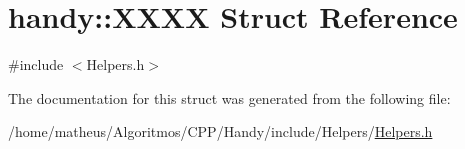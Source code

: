 \hypertarget{structhandy_1_1XXXX}{}\section{handy\+:\+:X\+X\+XX Struct Reference}
\label{structhandy_1_1XXXX}


{\ttfamily \#include $<$Helpers.\+h$>$}



The documentation for this struct was generated from the following file\+:\begin{DoxyCompactItemize}
\item 
/home/matheus/\+Algoritmos/\+C\+P\+P/\+Handy/include/\+Helpers/\hyperlink{Helpers_2Helpers_8h}{Helpers.\+h}\end{DoxyCompactItemize}
